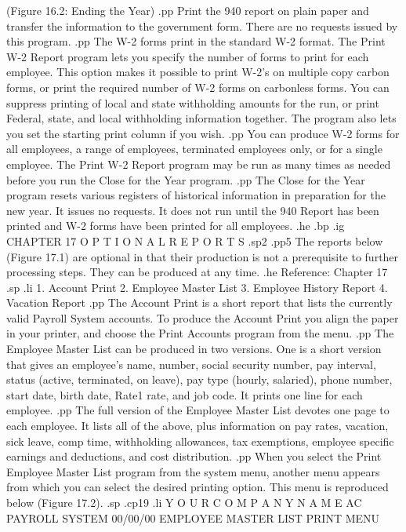 		 (Figure 16.2: Ending the Year)
.pp
Print the 940 report on plain paper and transfer the information to
the government form.  There are no requests issued by this program.
.pp
The W-2 forms print in the standard W-2 format.  The Print
W-2 Report program lets you specify the number of forms to print for each
employee.  This option makes it possible to print W-2's  on multiple copy
carbon forms, or print the required number of W-2 forms on carbonless forms.
You can suppress printing of local and state withholding amounts for
the run, or print Federal, state, and local withholding information together.
The program also lets you set the starting print column if you wish.
.pp
You can produce W-2 forms for all employees, a range of employees,
terminated employees only, or for a single employee.  The Print W-2
Report program may be run as many times as needed before you run the
Close for the Year program.
.pp
The Close for the Year program resets various registers of
historical information in preparation for the new year.  It issues
no requests.  It does not run until the 940 Report has been printed
and W-2 forms have been printed for all employees.
.he
.bp
.ig
CHAPTER 17
O P T I O N A L    R E P O R T S
.sp2
.pp5
The reports below (Figure 17.1)
are optional in that their production is not
a prerequisite to further processing steps.  They can be produced
at any time.
.he Reference: Chapter 17
.sp
.li
	       1. Account Print
	       2. Employee Master List
	       3. Employee History Report
	       4. Vacation Report
.pp
The Account Print is a short report that lists the currently
valid Payroll System accounts.	To produce the Account Print you
align the paper in your printer, and
choose the Print Accounts program from the menu.
.pp
The Employee Master List can be produced in two versions.  One is
a short version that gives an employee's name, number, social
security number, pay interval, status (active, terminated, on leave),
pay type (hourly, salaried), phone number, start date, birth date,
Rate1 rate, and job code.  It prints one line for each employee.
.pp
The full version of the Employee Master List devotes one page
to each employee.  It lists all of the above, plus information
on pay rates, vacation, sick leave, comp time, withholding allowances,
tax exemptions, employee specific earnings and deductions, and
cost distribution.
.pp
When you select the Print Employee Master List program from the system menu,
another menu appears from which you can select the desired printing
option.  This menu is reproduced below (Figure 17.2).
.sp
.cp19
.li
		 Y O U R    C O M P A N Y    N A M E
			 AC PAYROLL SYSTEM
00/00/00	   EMPLOYEE MASTER LIST PRINT MENU

